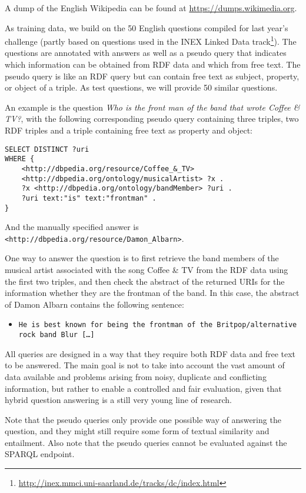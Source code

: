 A dump of the English Wikipedia can be found at \url{https://dumps.wikimedia.org}.

As training data, we build on the 50 English questions compiled for last year's challenge (partly based on questions used in the INEX Linked Data track\footnote{\url{http://inex.mmci.uni-saarland.de/tracks/dc/index.html}}).
The questions are annotated with answers as well as a pseudo query that indicates which information can be obtained from RDF data and which from free text.
The pseudo query is like an RDF query but can contain free text as subject, property, or object of a triple.
As test questions, we will provide 50 similar questions.

An example is the question \emph{Who is the front man of the band that wrote Coffee \& TV?}, with the following corresponding pseudo query
containing three triples, two RDF triples and a triple containing free text as property and object:

\begin{lstlisting}
SELECT DISTINCT ?uri
WHERE {
    <http://dbpedia.org/resource/Coffee_&_TV>
    <http://dbpedia.org/ontology/musicalArtist> ?x .
    ?x <http://dbpedia.org/ontology/bandMember> ?uri .
    ?uri text:"is" text:"frontman" .
}
\end{lstlisting}
And the manually specified answer is \texttt{<http://dbpedia.org/resource/Damon\_Albarn>}.

One way to answer the question is to first retrieve the band members of the musical artist associated with the song Coffee \& TV
from the RDF data using the first two triples, and then check the abstract of the returned URIs for the information whether they are the frontman of the band.
In this case, the abstract of Damon Albarn contains the following sentence:
\begin{itemize}
\item[] \texttt{He is best known for being the frontman of the Britpop/alternative rock band Blur [\ldots]}
\end{itemize}

All queries are designed in a way that they require both RDF data and free text to be answered.
The main goal is not to take into account the vast amount of data available and problems arising from noisy, duplicate and conflicting information, but rather to enable a controlled and fair evaluation, given that hybrid question answering is a still very young line of research.

Note that the pseudo queries only provide one possible way of answering the question, and they might still require some form of textual similarity and entailment.
Also note that the pseudo queries cannot be evaluated against the SPARQL endpoint.

